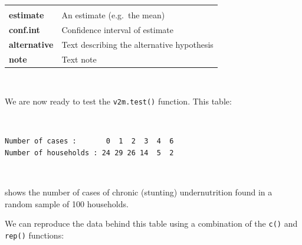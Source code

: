 \documentclass[12pt,a4paper]{book}
\theoremstyle{definition}
\theoremstyle{definition}
\theoremstyle{definition}
\theoremstyle{remark}
\begin{document}
\begin{longtable}[]{@{}ll@{}}
\begin{minipage}[t]{0.73\columnwidth}
\end{minipage}\tabularnewline
\begin{minipage}[t]{0.21\columnwidth}\raggedright
\textbf{estimate}\strut
\end{minipage} & \begin{minipage}[t]{0.73\columnwidth}\raggedright
An estimate (e.g.~the mean)\strut
\end{minipage}\tabularnewline
\begin{minipage}[t]{0.21\columnwidth}\raggedright
\textbf{conf.int}\strut
\end{minipage} & \begin{minipage}[t]{0.73\columnwidth}\raggedright
Confidence interval of estimate\strut
\end{minipage}\tabularnewline
\begin{minipage}[t]{0.21\columnwidth}\raggedright
\textbf{alternative}\strut
\end{minipage} & \begin{minipage}[t]{0.73\columnwidth}\raggedright
Text describing the alternative hypothesis\strut
\end{minipage}\tabularnewline
\begin{minipage}[t]{0.21\columnwidth}\raggedright
\textbf{note}\strut
\end{minipage} & \begin{minipage}[t]{0.73\columnwidth}\raggedright
Text note\strut
\end{minipage}\tabularnewline
\bottomrule
\end{longtable}

~

We are now ready to test the \texttt{v2m.test()} function. This table:

~

\begin{verbatim}
Number of cases :       0  1  2  3  4  6
Number of households : 24 29 26 14  5  2
\end{verbatim}

~

shows the number of cases of chronic (stunting) undernutrition found in
a random sample of 100 households.

We can reproduce the data behind this table using a combination of the
\texttt{c()} and \texttt{rep()} functions:

~
\end{document}
